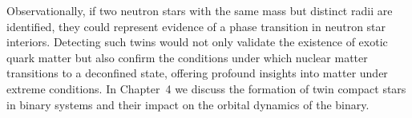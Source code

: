 \documentclass[main.tex]{subfiles}
\begin{document}
    Observationally, if two neutron stars with the same mass but distinct radii are identified, they could represent evidence of a phase transition in neutron star interiors. Detecting such twins would not only validate the existence of exotic quark matter but also confirm the conditions under which nuclear matter transitions to a deconfined state, offering profound insights into matter under extreme conditions. In Chapter~4 we discuss the formation of twin compact stars in binary systems and their impact on the orbital dynamics of the binary.
    


\end{document}
